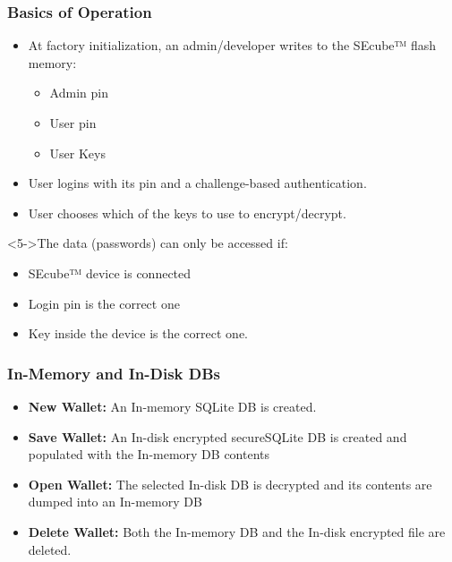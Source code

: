 \documentclass[14pt,usenames,dvipsnames]{beamer}
\begin{document}
\begin{frame}
	\frametitle{Basics of Operation}
{\fontsize{13pt}{14}\selectfont	
	\begin{itemize}
	\setlength\itemsep{15pt}
	 \item<2-> At factory initialization, an admin/developer writes to the SEcube™ flash memory:
	   \begin{itemize}
	   	
	     \item<2-> {\fontsize{12pt}{14}\selectfont Admin pin}
	     \item<2-> {\fontsize{12pt}{14}\selectfont User pin}
	     \item<2-> {\fontsize{12pt}{14}\selectfont User Keys}
	   \end{itemize}
	 \item<3-> User logins with its pin and a challenge-based authentication.
	 \item<4-> User chooses which of the keys to use to encrypt/decrypt.	  
	\end{itemize}
	
\begin{alertblock}<5->{The data (passwords) can only be accessed if:}
 \begin{itemize}
       \setlength\itemsep{0pt}
	     \item<2-> SEcube™ device is connected
	     \item<2-> Login pin is the correct one
	     \item<2-> Key inside the device is the correct one.
	   \end{itemize}
\end{alertblock}	
}	
\end{frame}

\begin{frame}
	\frametitle{In-Memory and In-Disk DBs}
  \begin{itemize}
  \setlength\itemsep{10pt}
    \item<2-> \textbf{New Wallet:} An In-memory SQLite DB is created.
    \item<3-> \textbf{Save Wallet:} An In-disk encrypted secureSQLite DB is created and populated with the In-memory DB contents
    \item<4-> \textbf{Open Wallet:} The selected In-disk DB is decrypted and its contents are dumped into an In-memory DB
    \item<5-> \textbf{Delete Wallet:} Both the In-memory DB and the In-disk encrypted file are deleted.
  \end{itemize}
\end{frame}
\end{document}
